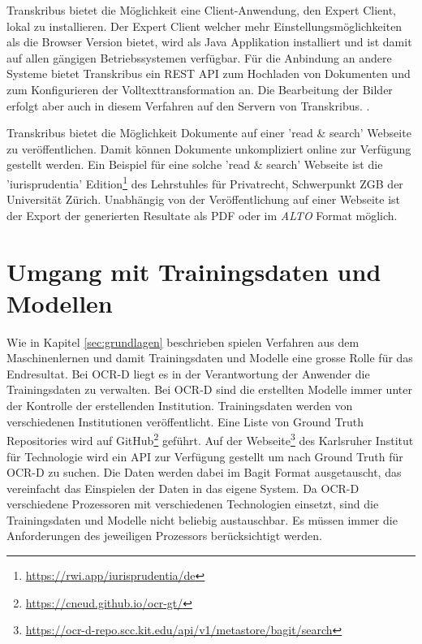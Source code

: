\documentclass[a4paper,oneside, 12pt]{report}
\begin{document}
Transkribus bietet die Möglichkeit eine Client-Anwendung, den Expert Client, lokal zu installieren. Der Expert Client welcher mehr Einstellungsmöglichkeiten als die Browser Version bietet, wird als Java Applikation installiert und ist damit auf allen gängigen Betriebssystemen verfügbar. 
Für die Anbindung an andere Systeme bietet Transkribus ein REST API zum Hochladen von Dokumenten und zum Konfigurieren der Volltexttransformation an. Die Bearbeitung der Bilder erfolgt aber auch in diesem Verfahren auf den Servern von Transkribus. \cite{transkribusapi}. 

Transkribus bietet die Möglichkeit Dokumente auf einer 'read \& search' Webseite zu veröffentlichen. Damit können Dokumente unkompliziert online zur Verfügung gestellt werden. Ein Beispiel für eine solche 'read \& search' Webseite ist die 'iurisprudentia' Edition\footnote{\url{https://rwi.app/iurisprudentia/de}}  des Lehrstuhles für Privatrecht, Schwerpunkt ZGB der Universität Zürich. Unabhängig von der Veröffentlichung auf einer Webseite ist der Export der generierten Resultate als PDF oder im \textit{ALTO} Format möglich. \cite{transkribus}



\section{Umgang mit Trainingsdaten und Modellen}
Wie in Kapitel \ref{sec:grundlagen} beschrieben spielen Verfahren aus dem Maschinenlernen und damit Trainingsdaten und Modelle eine grosse Rolle für das Endresultat. Bei OCR-D liegt es in der Verantwortung der Anwender die Trainingsdaten zu verwalten. Bei OCR-D sind die erstellten Modelle immer unter der Kontrolle der erstellenden Institution. Trainingsdaten werden von verschiedenen Institutionen veröffentlicht. Eine Liste von Ground Truth Repositories wird auf GitHub\footnote{\url{https://cneud.github.io/ocr-gt/}} geführt. Auf der Webseite\footnote{\url{https://ocr-d-repo.scc.kit.edu/api/v1/metastore/bagit/search}} des Karlsruher Institut für Technologie wird ein API zur Verfügung gestellt um nach Ground Truth für OCR-D zu suchen. Die Daten werden dabei im Bagit Format ausgetauscht, das vereinfacht das Einspielen der Daten in das eigene System. Da OCR-D verschiedene Prozessoren mit verschiedenen Technologien einsetzt, sind die Trainingsdaten und Modelle nicht beliebig austauschbar. Es müssen immer die Anforderungen des jeweiligen Prozessors berücksichtigt werden. \cite{ocrdgtrepo}
\end{document}
